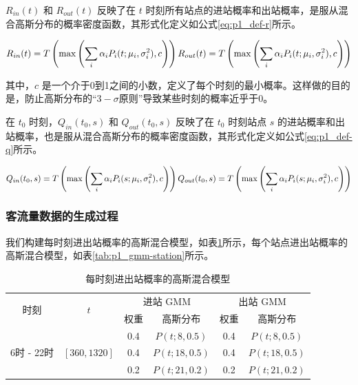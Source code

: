 \documentclass[12pt,a4paper]{mcmthesis}
\begin{document}
    $R_{in}(t)$ 和 $R_{out}(t)$ 反映了在 $t$ 时刻所有站点的进站概率和出站概率，是服从混合高斯分布的概率密度函数，其形式化定义如公式\ref{eq:p1_def-r}所示。

    \begin{equation}
        R_{in}(t) = T \left( \max \left( \sum_i \alpha_i P_i(t;\mu_i,\sigma^2_i), c \right) \right) \\
        R_{out}(t) = T \left( \max \left( \sum_i \alpha_i P_i(t;\mu_i,\sigma^2_i), c \right) \right)
        \label{eq:p1_def-r}
    \end{equation}

    其中，$c$ 是一个介于0到1之间的小数，定义了每个时刻的最小概率。这样做的目的是，防止高斯分布的“$3-\sigma$原则”导致某些时刻的概率近乎于0。

    在 $t_0$ 时刻，$Q_{in}(t_0,s)$ 和 $Q_{out}(t_0,s)$ 反映了在 $t_0$ 时刻站点 $s$ 的进站概率和出站概率，也是服从混合高斯分布的概率密度函数，其形式化定义如公式\ref{eq:p1_def-q}所示。

    \begin{equation}
        Q_{in}(t_0,s) = T \left( \max \left( \sum_i \alpha_i P_i(s;\mu_i,\sigma^2_i), c \right) \right) \\
        Q_{out}(t_0,s) = T \left( \max \left( \sum_i \alpha_i P_i(s;\mu_i,\sigma^2_i), c \right) \right)
        \label{eq:p1_def-q}
    \end{equation}

    \subsubsection{客流量数据的生成过程}

    我们构建每时刻进出站概率的高斯混合模型，如表\ref{tab:p1_gmm-time}所示，每个站点进出站概率的高斯混合模型，如表\ref{tab:p1_gmm-station}所示。

    \begin{table}[h]
        \centering
        \caption{每时刻进出站概率的高斯混合模型}
        \label{tab:p1_gmm-time}
        \begin{tabular}{c|c|cc|cc}
            \hline
            \multirow{2}{*}{时刻} & \multirow{2}{*}{$t$} & \multicolumn{2}{c|}{进站 GMM} & \multicolumn{2}{c}{出站 GMM} \\ \cline{3-6}
            &                         & 权重  & 高斯分布          & 权重  & 高斯分布          \\ \hline
            &                         & 0.4 & $P(t;8,0.5)$  & 0.4 & $P(t;8,0.5)$  \\
            6时 - 22时 & $\left[360,1320\right]$ & 0.4 & $P(t;18,0.5)$ & 0.4 & $P(t;18,0.5)$ \\
            &                         & 0.2 & $P(t;21,0.2)$ & 0.2 & $P(t;21,0.2)$ \\ \hline
        \end{tabular}
    \end{table}
\end{document}
